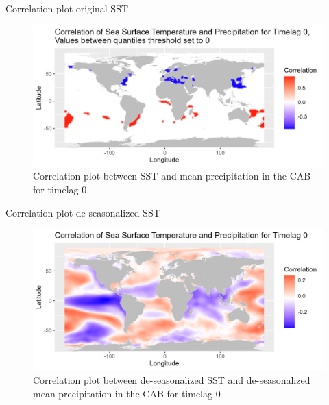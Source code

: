 \documentclass[
  ignorenonframetext,
]{beamer}
\begin{document}
\begin{frame}{Correlation plot original SST}
\protect\hypertarget{correlation-plot-original-sst-1}{}
\begin{figure}

{\centering \includegraphics[width=0.65\linewidth,height=0.65\textheight]{../pres-plots/og-data/q-corr-0} 

}

\caption{Correlation plot between SST and mean precipitation in the CAB for timelag 0}\label{fig:corr-0q}
\end{figure}
\end{frame}

\begin{frame}{Correlation plot de-seasonalized SST}
\protect\hypertarget{correlation-plot-de-seasonalized-sst}{}
\begin{figure}

{\centering \includegraphics[width=0.65\linewidth,height=0.65\textheight]{../pres-plots/des-data/corr-0} 

}

\caption{Correlation plot between de-seasonalized SST and de-seasonalized mean precipitation in the CAB for timelag 0}\label{fig:des-corr-0}
\end{figure}
\end{frame}
\end{document}
